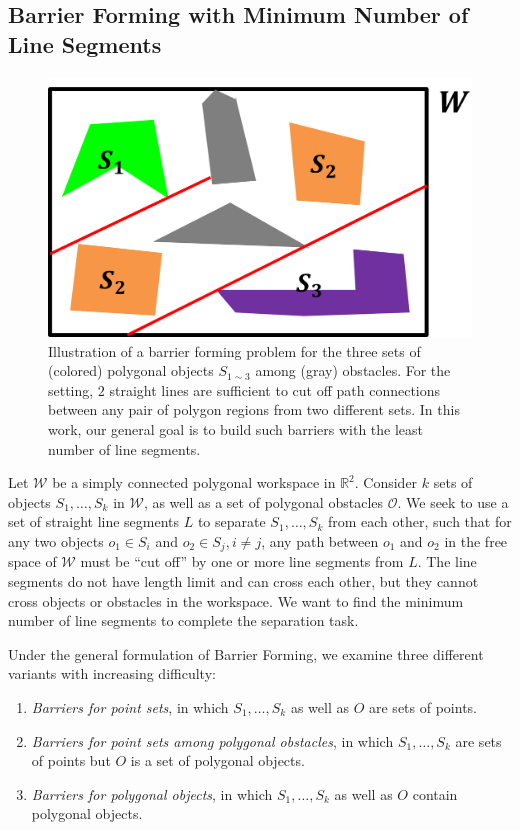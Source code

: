 \subsection{Barrier Forming with Minimum Number of Line Segments}

\begin{figure}[ht]
    \centering
    \vspace{.05in}
    \includegraphics[width = .35\textwidth]{chapters/bc/fig/formulation_pic.png}
    \vspace{.05in}
    \caption{Illustration of a barrier forming problem for the three sets of (colored) polygonal objects $S_{1\sim3}$ among (gray) obstacles. For the setting, $2$ straight lines are sufficient to cut off path connections between any pair of polygon regions from two different sets. In this work, our general goal is to build such barriers with the least number of line segments.}
    \label{fig:my_label}
\end{figure}

Let $\mathcal{W}$ be a simply connected polygonal workspace in $\mathbb R^2$. Consider $k$ sets of objects $S_1, \dots, S_k$ in $\mathcal W$, as well as a set of polygonal obstacles $\mathcal O$. 
We seek to use a set of straight line segments $L$ to separate $S_1, \dots, S_k$ from each other, such that for any two objects $o_1 \in S_i$ and $o_2 \in S_j, i \ne j$, any path between $o_1$ and $o_2$ in the free space of $\mathcal W$ must be ``cut off'' by one or more line segments from $L$. 
The line segments do not have length limit and can cross each other, but they cannot cross objects or obstacles in the workspace. We want to find the minimum number of line segments to complete the separation task. 

Under the general formulation of Barrier Forming, we examine three different variants with increasing difficulty:
\begin{enumerate} 
\item \emph{Barriers for point sets}, in which  $S_1, \dots, S_k$ as well as $O$ are sets of points. 
\item \emph{Barriers for point sets among polygonal obstacles}, in which  $S_1, \dots, S_k$ are sets of points but $O$ is a set of polygonal objects. 
\item \emph{Barriers for polygonal objects}, in which $S_1, \dots, S_k$ as well as $O$ contain polygonal objects. 
\end{enumerate}

